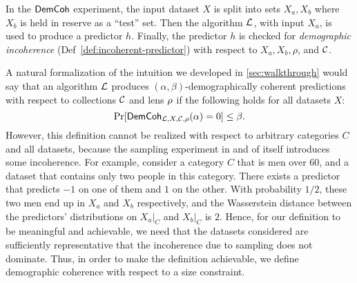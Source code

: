 \begin{itemize}[leftmargin=*,itemsep=0pt]
{In the $\mathsf{DemCoh}$ experiment, the input dataset $X$ is split into sets $X_a, X_b$ where $X_b$ is held in reserve as a ``test'' set. Then the algorithm $\mathcal{L}$, with input $X_a$, is used to produce a predictor $h$. Finally, the predictor $h$ is checked for \emph{demographic incoherence} (Def~\ref{def:incoherent-predictor}) with respect to $X_a,X_b,\rho$, and $\mathcal{C}$.}



\medskip\noindent
A natural formalization of the intuition we developed in \cref{sec:walkthrough} would say that an algorithm $\mathcal{L}$ produces $(\alpha,\beta)$-demographically coherent predictions with respect to collections $\mathcal{C}$ and lens $\rho$ if the following holds for all datasets $X$:
 \[\Pr[\mathsf{DemCoh}_{\mathcal{L},X,\mathcal{C},\rho}(\alpha) = 0] \leq \beta.\]
However, this definition cannot be realized with respect to arbitrary categories $C$ and all datasets, because the sampling experiment in and of itself introduces some incoherence. For example, consider a category $C$ that is men over 60, and a dataset that contains only two people in this category. There exists a predictor that predicts $-1$ on one of them and $1$ on the other. With probability $1/2$, these two men end up in $X_a$ and $X_b$ respectively, and the Wasserstein distance between the predictors' distributions on $X_a|_C$ and $X_b|_C$ is $2$. Hence, for our definition to be meaningful and achievable, we need that the datasets considered are sufficiently representative that the incoherence due to sampling does not dominate. Thus, in order to make the definition achievable, we define demographic coherence with respect to a size constraint. 



\end{itemize}
